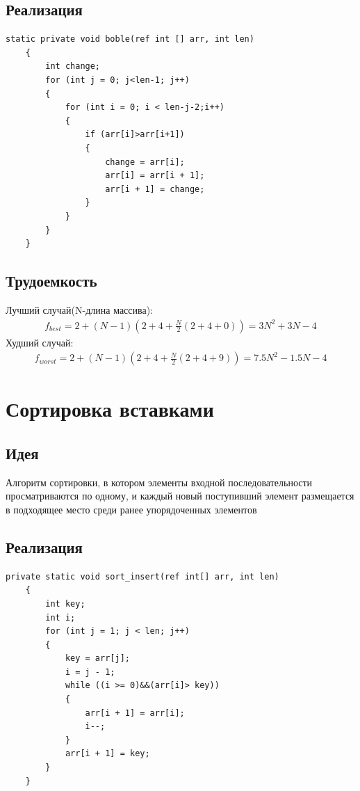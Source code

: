 \documentclass[a4paper,12pt]{article}
\begin{document}
	\subsection{Реализация}
	\begin{lstlisting}[label=some-code,caption={Сортировка пузырьком.}]
	static private void boble(ref int [] arr, int len)
	{
		int change;
		for (int j = 0; j<len-1; j++)
		{
			for (int i = 0; i < len-j-2;i++)
			{
				if (arr[i]>arr[i+1])
				{
					change = arr[i];
					arr[i] = arr[i + 1];
					arr[i + 1] = change;
				}
			}
		}
	}
	\end{lstlisting}
	\subsection{Трудоемкость}
	Лучший случай(N-длина массива):
	\begin{gather*}
	f_{best} = 2+(N-1)(2+4+\frac{N}{2}(2+4+0)) = 3N^2+3N-4
	\end{gather*}
	Худший случай:
	\begin{gather*}
	f_{worst} = 2+(N-1)(2+4+\frac{N}{2}(2+4+9)) = 7.5N^2-1.5N-4
	\end{gather*}
\section{Сортировка вставками}
	\subsection{Идея}
	Алгоритм сортировки, в котором элементы входной последовательности просматриваются по одному, и каждый новый поступивший элемент размещается в подходящее место среди ранее упорядоченных элементов
	\subsection{Реализация}
	\begin{lstlisting}[label=some-code1,caption={Сортировка вставками}]
	private static void sort_insert(ref int[] arr, int len)
	{
		int key;
		int i;
		for (int j = 1; j < len; j++)
		{
			key = arr[j];
			i = j - 1;
			while ((i >= 0)&&(arr[i]> key))
			{
				arr[i + 1] = arr[i];
				i--;
			}
			arr[i + 1] = key;
		}
	}
	\end{lstlisting}
\end{document}

